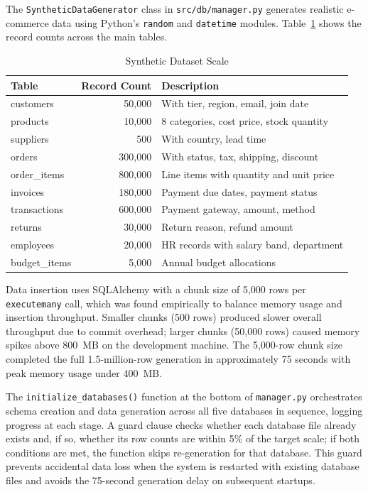 \documentclass[12pt,a4paper]{report}
\begin{document}
The \texttt{SyntheticDataGenerator} class in \texttt{src/db/manager.py} generates realistic e-commerce data using Python's \texttt{random} and \texttt{datetime} modules. Table~\ref{tab:synthetic-data} shows the record counts across the main tables.

\begin{table}[H]
  \centering
  \caption{Synthetic Dataset Scale}
  \label{tab:synthetic-data}
  \renewcommand{\arraystretch}{1.2}
  \begin{tabularx}{\textwidth}{@{}lrl@{}}
    \toprule
    \textbf{Table} & \textbf{Record Count} & \textbf{Description} \\
    \midrule
    customers      & 50,000  & With tier, region, email, join date \\
    products       & 10,000  & 8 categories, cost price, stock quantity \\
    suppliers      & 500     & With country, lead time \\
    orders         & 300,000 & With status, tax, shipping, discount \\
    order\_items   & 800,000 & Line items with quantity and unit price \\
    invoices       & 180,000 & Payment due dates, payment status \\
    transactions   & 600,000 & Payment gateway, amount, method \\
    returns        & 30,000  & Return reason, refund amount \\
    employees      & 20,000  & HR records with salary band, department \\
    budget\_items  & 5,000   & Annual budget allocations \\
    \bottomrule
  \end{tabularx}
\end{table}

Data insertion uses SQLAlchemy with a chunk size of 5,000 rows per \texttt{executemany} call, which was found empirically to balance memory usage and insertion throughput. Smaller chunks (500 rows) produced slower overall throughput due to commit overhead; larger chunks (50,000 rows) caused memory spikes above 800~MB on the development machine. The 5,000-row chunk size completed the full 1.5-million-row generation in approximately 75 seconds with peak memory usage under 400~MB.

The \texttt{initialize\_databases()} function at the bottom of \texttt{manager.py} orchestrates schema creation and data generation across all five databases in sequence, logging progress at each stage. A guard clause checks whether each database file already exists and, if so, whether its row counts are within 5\% of the target scale; if both conditions are met, the function skips re-generation for that database. This guard prevents accidental data loss when the system is restarted with existing database files and avoids the 75-second generation delay on subsequent startups.
\end{document}
